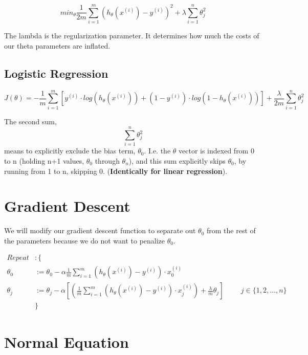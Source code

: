 \begin{center}
	$$min_\theta   \frac{1}{2m}\sum_{i=1}^{m}\left(h_\theta(x^{(i)}) - y^{(i)}\right)^2 + \lambda  \sum_{i=1}^{n} \theta_j^2$$
\end{center}

The lambda is the regularization parameter. It determines how much the costs of our theta parameters are inflated.

\subsection{Logistic Regression}

\begin{center}
	$$J(\theta) = -\frac{1}{m}\sum_{i=1}^{m}\left[y^{(i)}\cdot log(h_\theta(x^{(i)})) +(1-y^{(i)})\cdot log(1-h_\theta(x^{(i)}))\right] + \frac{\lambda}{2m}  \sum_{i=1}^{n} \theta_j^2$$
\end{center}

The second sum, $$\sum_{i=1}^{n} \theta_j^2$$ means to explicitly exclude the bias term, $ \theta_0 $. I.e. the $ \theta $ vector is indexed from 0 to n (holding n+1 values, $ \theta_0 $ through $ \theta_n $), and this sum explicitly skips $ \theta_0 $, by running from 1 to n, skipping 0. (\textbf{Identically for linear regression}).

\section{Gradient Descent}

We will modify our gradient descent function to separate out $ \theta_0 $ from the rest of the parameters because we do not want to penalize $ \theta_0 $.

\begin{align*}
Repeat &: \{\\
\theta_0 &:= \theta_0-\alpha \frac{1}{m} \sum_{i=1}^{m}\left(h_\theta(x^{(i)})-y^{(i)}\right)\cdot x^{(i)}_0\\
\theta_j &:= \theta_j-\alpha \left[ \left(\frac{1}{m} \sum_{i=1}^{m}\left(h_\theta(x^{(i)})-y^{(i)}\right)\cdot x^{(i)}_j  \right) +\frac{\lambda}{m}\theta_j\right] \hspace{1cm} j \in \{1,2, \dots, n\}\\
&   \}
\end{align*}

\section{Normal Equation}

